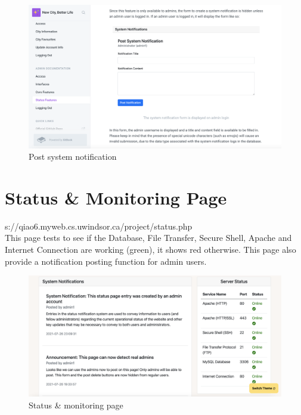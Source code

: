 \documentclass[12pt, letterpaper]{article}
\begin{document}
 \begin{figure}[htbp]
	\centering
	\includegraphics[width=5in]{images/q18-2.png}
	\caption{Post system notification}
 \end{figure}

 \newpage

\section{Status \& Monitoring Page}s://qiao6.myweb.cs.uwindsor.ca/project/status.php
\\This page tests to see if the Database, File Transfer, Secure Shell, Apache and Internet Connection are working (green), it shows red otherwise. This page also provide a notification posting function for admin users.

\begin{figure}[htbp]
	\centering
	\includegraphics[width=5in]{images/q19.png}
	\caption{Status \& monitoring page}
 \end{figure}

 \newpage
\end{document}
